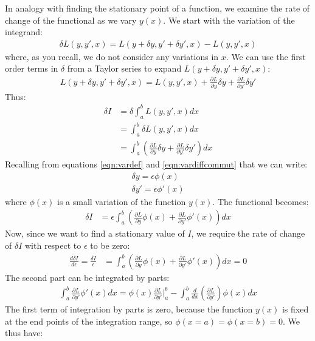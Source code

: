 \noindent
In analogy with finding the stationary point of a function, we examine the rate of change of the functional as we vary $y(x)$. We start with the variation of the integrand:
\begin{align}
\delta L(y,y',x)=L(y+\delta y, y'+\delta y', x)-L(y,y',x)
\end{align}
where, as you recall, we do not consider any variations in $x$. We can use the first order terms in $\delta$ from a Taylor series to expand $L(y+\delta y, y'+\delta y', x)$:
\begin{align}
L(y+\delta y, y'+\delta y', x)=L(y,y',x)+\frac{\partial L}{\partial y}\delta y+\frac{\partial L}{\partial y'}\delta y'
\end{align}
Thus:
\begin{align}
\delta I &= \delta \int_a^b L(y,y',x)dx\nonumber\\
&= \int_a^b \delta L(y,y',x)dx\nonumber\\
&= \int_a^b  \left( \frac{\partial L}{\partial y}\delta y+\frac{\partial L}{\partial y'}\delta y'\right)dx
\end{align}
Recalling from equations \ref{eqn:vardef} and \ref{eqn:vardiffcommut}  that we can write:
\begin{align}
\delta y = \epsilon \phi(x)\nonumber\\
\delta y' = \epsilon \phi'(x)
\end{align}
where $\phi(x)$ is a small variation of the function $y(x)$. The functional becomes:
\begin{align}
\delta I &=\epsilon \int_a^b  \left( \frac{\partial L}{\partial y}\phi(x)+\frac{\partial L}{\partial y'}\phi'(x)\right)dx
\end{align}
Now, since we want to find a stationary value of $I$, we require the rate of change of $\delta I$ with respect to $\epsilon$ to be zero:
\begin{align}
\frac{d\delta I}{d\epsilon}=\frac{\delta I}{\epsilon} &=\int_a^b  \left( \frac{\partial L}{\partial y}\phi(x)+\frac{\partial L}{\partial y'}\phi'(x)\right)dx=0
\end{align}
The second part can be integrated by parts:
\begin{align}
\int_a^b \frac{\partial L}{\partial y'}\phi'(x)dx=\phi(x)\frac{\partial L}{\partial y'}\Big |_a^b-\int_a^b \frac{d}{dx}\left(\frac{\partial L}{\partial y'}\right)\phi(x)dx
\end{align}
The first term of integration by parts is zero, because the function $y(x)$ is fixed at the end points of the integration range, so $\phi(x=a)=\phi(x=b)=0$. We thus have:

